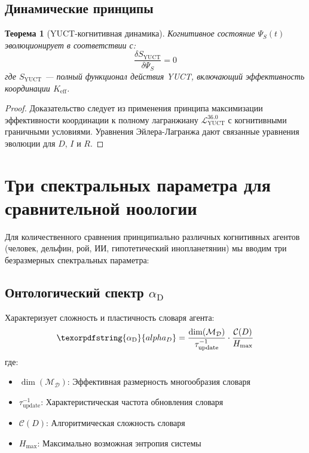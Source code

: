 \documentclass[12pt,a4paper]{article}
\newtheorem{theorem}{Теорема}
\DeclareRobustCommand{\alD}{\texorpdfstring{\ensuremath{\alpha_{\mathrm{D}}}}{alpha_D}}
\newcommand{\eff}{\mathrm{eff}}
\newcommand{\Dict}{\mathcal{D}}
\newcommand{\Mdict}{\mathcal{M}_{\Dict}}
\newcommand{\Ke}{K_{\eff}}
\begin{document}
	\subsection{Динамические принципы}
	
	\begin{theorem}[YUCT-когнитивная динамика]
		Когнитивное состояние \(\Psi_S(t)\) эволюционирует в соответствии с:
		\begin{equation}
			\label{eq:cognitive-dynamics}
			\frac{\delta S_{\mathrm{YUCT}}}{\delta \Psi_S} = 0
		\end{equation}
		где \(S_{\mathrm{YUCT}}\) — полный функционал действия YUCT, включающий эффективность координации \(\Ke\).
	\end{theorem}
	
	\begin{proof}
		Доказательство следует из применения принципа максимизации эффективности координации к полному лагранжиану \(\mathcal{L}_{\mathrm{YUCT}}^{36.0}\) с когнитивными граничными условиями. Уравнения Эйлера-Лагранжа дают связанные уравнения эволюции для \(D\), \(I\) и \(R\).
	\end{proof}
	
	\section{Три спектральных параметра для сравнительной ноологии}
	
	Для количественного сравнения принципиально различных когнитивных агентов (человек, дельфин, рой, ИИ, гипотетический инопланетянин) мы вводим три безразмерных спектральных параметра:
	
	\subsection{Онтологический спектр \alD}
	
	Характеризует сложность и пластичность словаря агента:
	\begin{equation}
		\label{eq:alphaD}
		\alD = \frac{\dim(\Mdict)}{\tau_{\mathrm{update}}^{-1}} \cdot \frac{\mathcal{C}(D)}{H_{\mathrm{max}}}
	\end{equation}
	где:
	\begin{itemize}
		\item \(\dim(\Mdict)\): Эффективная размерность многообразия словаря
		\item \(\tau_{\mathrm{update}}^{-1}\): Характеристическая частота обновления словаря
		\item \(\mathcal{C}(D)\): Алгоритмическая сложность словаря
		\item \(H_{\mathrm{max}}\): Максимально возможная энтропия системы
	\end{itemize}
	
\end{document}
